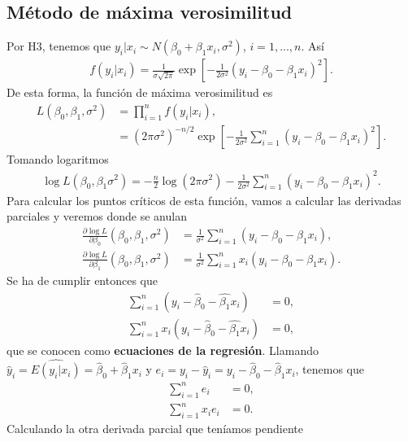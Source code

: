 \subsection{Método de máxima verosimilitud}
\noindent Por H3, tenemos que $y_i | x_i \sim N(\beta_0 + \beta_1 x_i, \sigma^2)$, $i=1,...,n$. Así
\begin{align*}
    f(y_i | x_i) = \frac{1}{\sigma\sqrt{2\pi}} \exp \left[ - \frac{1}{2\sigma^2}(y_i - \beta_0 - \beta_1 x_i)^2 \right].
\end{align*}
De esta forma, la función de máxima verosimilitud es
\begin{align*}
    L(\beta_0,\beta_1,\sigma^2) &= \prod_{i=1}^{n} f(y_i | x_i), \\
    &= \left( 2\pi \sigma^2 \right)^{-n/2} \exp\left[ - \frac{1}{2\sigma^2} \sum_{i=1}^{n}(y_i - \beta_0 - \beta_1 x_i)^2 \right].
\end{align*}
Tomando logaritmos
\begin{align*}
    \log L(\beta_0,\beta_1\sigma^2) = - \frac{n}{2} \log\left(2\pi\sigma^2\right) - \frac{1}{2\sigma^2} \sum_{i=1}^{n}(y_i - \beta_0 - \beta_1 x_i)^2 .
\end{align*}
Para calcular los puntos críticos de esta función, vamos a calcular las derivadas parciales y veremos donde se anulan
\begin{align*}
    \frac{\partial \log L}{\partial \beta_0}(\beta_0,\beta_1,\sigma^2) &= \frac{1}{\sigma^2} \sum_{i=1}^{n}(y_i - \beta_0 - \beta_1 x_i), \\
    \frac{\partial \log L}{\partial \beta_1}(\beta_0,\beta_1,\sigma^2) &= \frac{1}{\sigma^2} \sum_{i=1}^{n}x_i(y_i - \beta_0 - \beta_1 x_i).
\end{align*}
Se ha de cumplir entonces que
\begin{align*}
    \sum_{i=1}^{n}(y_i - \widehat{\beta}_0 - \widehat{\beta_1} x_i) &= 0, \\
    \sum_{i=1}^{n}x_i(y_i - \widehat{\beta}_0 - \widehat{\beta_1} x_i) &= 0,
\end{align*}
que se conocen como \textbf{ecuaciones de la regresión}. Llamando $\widehat{y}_i = \widehat{E(y_i|x_i)} = \widehat{\beta}_0 + \widehat{\beta}_1 x_i$ y $e_i = y_i - \widehat{y}_i = y_i - \widehat{\beta}_0 - \widehat{\beta}_1x_i$, tenemos que
\begin{align*}
    \sum_{i=1}^{n} e_i &= 0, \\
    \sum_{i=1}^{n}x_ie_i &= 0.
\end{align*}
Calculando la otra derivada parcial que teníamos pendiente
